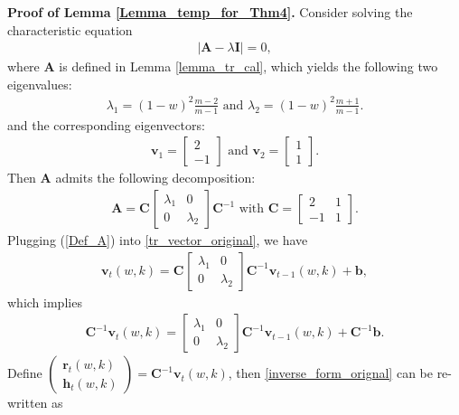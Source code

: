 \noindent
\textbf{Proof of Lemma \ref{Lemma_temp_for_Thm4}.} Consider solving the characteristic equation  
\begin{align}
|\bm{A} - \lambda \bm{I}| = 0,
\end{align}
where $\bm{A}$ is defined in Lemma \ref{lemma_tr_cal},
which yields the following two eigenvalues:
\begin{align*}
\lambda_1 = (1-w)^2 \frac{m-2}{m-1} \mbox{ and }
\lambda_2 = (1-w)^2 \frac{m+1}{m-1}.
\end{align*}
and the corresponding eigenvectors:
\begin{align*}
\bm{v}_1 = 
\begin{bmatrix}
2 \\ 
-1
\end{bmatrix} \mbox{ and }
\bm{v}_2 = 
\begin{bmatrix}
1 \\ 
1
\end{bmatrix}.
\end{align*}
Then $\bm{A}$ admits the following decomposition:
\begin{align}
\label{Def_A}
\bm{A}=\bm{C}^{}\begin{bmatrix}
\lambda_1 & 0\\
0 & \lambda_2
\end{bmatrix} \bm{C}^{-1} \mbox{ with }
\bm{C} = 
\begin{bmatrix}
  2 & 1 \\ 
  -1 & 1
\end{bmatrix}.
\end{align}
Plugging (\ref{Def_A}) into \eqref{tr_vector_original}, we have
\begin{align*}
\bm{v}_t(w,k) = \bm{C}^{}\begin{bmatrix}
\lambda_1 & 0\\
0 & \lambda_2
\end{bmatrix} \bm{C}^{-1} \bm{v}_{t-1}(w,k) + \bm{b},
\end{align*}
which implies
\begin{align}
\label{inverse_form_orignal}
\bm{C}^{-1} \bm{v}_t(w,k) =\begin{bmatrix}
\lambda_1 & 0\\
0 & \lambda_2
\end{bmatrix} \bm{C}^{-1} \bm{v}_{t-1}(w,k) + \bm{C}^{-1}\bm{b}.
\end{align}
Define $\begin{pmatrix}
    \bm{r}_t(w,k) \\ \bm{h}_t(w,k)
\end{pmatrix}=\bm{C}^{-1} \bm{v}_t(w,k)$, then \eqref{inverse_form_orignal} can be re-written as
